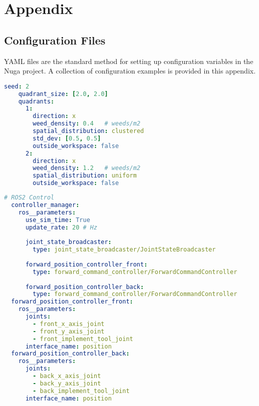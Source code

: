 \chapter{Appendix}\label{sec:appendix}
\section{Configuration Files}
YAML files are the standard method for setting up configuration variables in the Nuga project. A collection of configuration examples is provided in this appendix.

\begin{lstlisting}[language=yaml, frame=tb, caption={Weed Infestation World config example}, label={lst:world-yaml}, float=h]
    seed: 2
    quadrant_size: [2.0, 2.0]
    quadrants:
      1:
        direction: x
        weed_density: 0.4   # weeds/m2
        spatial_distribution: clustered
        std_dev: [0.5, 0.5]
        outside_workspace: false
      2:
        direction: x
        weed_density: 1.2   # weeds/m2
        spatial_distribution: uniform
        outside_workspace: false
\end{lstlisting}    

\begin{lstlisting}[language=yaml, frame=tb, caption={ROS$2$ config example}, label={lst:ros2_control-yaml}, float=htb]
  # ROS2 Control
  controller_manager:
    ros__parameters:
      use_sim_time: True
      update_rate: 20 # Hz
  
      joint_state_broadcaster:
        type: joint_state_broadcaster/JointStateBroadcaster
  
      forward_position_controller_front:
        type: forward_command_controller/ForwardCommandController
      
      forward_position_controller_back:
        type: forward_command_controller/ForwardCommandController
  forward_position_controller_front:
    ros__parameters:
      joints:
        - front_x_axis_joint
        - front_y_axis_joint
        - front_implement_tool_joint
      interface_name: position
  forward_position_controller_back:
    ros__parameters:
      joints:
        - back_x_axis_joint
        - back_y_axis_joint
        - back_implement_tool_joint
      interface_name: position
\end{lstlisting} 

